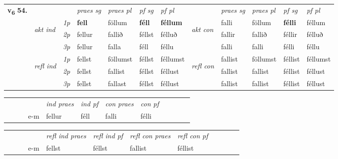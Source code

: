\begin{tabular}{llllllllllll} \toprule
\multirow{4}{*}{{{\textbf{v{\textsubscript{6}}} \Large{\textbf{54.}}}}}  & &   &  \textit{praes sg}  & \textit{praes pl}  &\textit{ pf sg} & \textit{pf pl} &  &  \textit{praes sg}  & \textit{praes pl}  & \textit{pf sg} & \textit{pf pl } \\*
	\cmidrule{4-7} \cmidrule{9-12}
 & \multirow{3}{*}{\begin{turn}{90}\textit{akt ind}\end{turn}} & {\textit{1p}} & \textbf{fell} & föllum    & \textbf{féll} & \textbf{féllum} & \multirow{3}{*}{\begin{turn}{90}\textit{akt con}\end{turn}} &falli & föllum & \textbf{félli} & féllum\\*
& &  {\textit{2p}} &  fellur  & fallið   & féllst & félluð & & fallir & fallið & féllir & félluð \\*
& &  {\textit{3p}} & fellur & falla   & féll & féllu & & falli & falli& félli & féllu  \\*
\cmidrule{4-7} \cmidrule{9-12}
 &\multirow{3}{*}{\begin{turn}{90}\textit{refl ind}\end{turn}} & {\textit{1p}} & fellst & föllumst    & féllst & féllumst & \multirow{3}{*}{\begin{turn}{90}\textit{refl con}\end{turn}}  &fallist & föllumst & féllist & féllumst\\*
 &&  {\textit{2p}} &  fellst  & fallist   & féllst & féllust & &fallist & fallist & féllist & féllust \\*
& &  {\textit{3p}} & fellst & fallast   & féllst & féllust & & fallist & fallist& féllist & féllust  \\*
\cmidrule{4-7} \cmidrule{9-12}
\end{tabular}


\begin{tabular}{llllllllllll}
 & &  & &  \textit{ind praes} & \textit{ind pf} & \textit{con praes} & \textit{con pf} \\*
&  & & e-m & fellur & féll & falli & félli \\*
\cmidrule{5-9}
\end{tabular}


\begin{tabular}{llllllllllll}
 & &  & &  \textit{refl ind praes} & \textit{refl ind pf} & \textit{refl con praes} & \textit{refl con pf} \\*
&  & & e-m & fellst & féllst & fallist & féllist \\*
\cmidrule{5-9}
\end{tabular}


